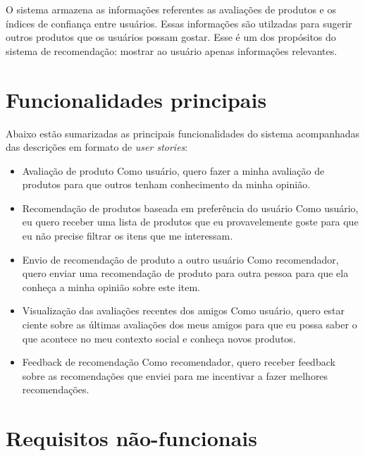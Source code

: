  O sistema armazena as informações referentes as avaliações de produtos e os índices de confiança entre usuários. Essas informações são utilzadas para sugerir outros produtos que os usuários possam gostar. Esse é um dos propósitos do sistema de recomendação: mostrar ao usuário apenas informações relevantes.

\section{Funcionalidades principais} %
\label{sec:funcionalidades_principais}

Abaixo estão sumarizadas as principais funcionalidades do sistema acompanhadas das descrições em formato de \textit{user stories}\cite{557458}:

\begin{itemize}
	
	\item Avaliação de produto
  \subitem Como usuário, quero fazer a minha avaliação de produtos para que outros tenham conhecimento da minha opinião.
  
	\item Recomendação de produtos baseada em preferência do usuário
	\subitem Como usuário, eu quero receber uma lista de produtos que eu provavelemente goste para que eu não precise filtrar os itens que me interessam.

	\item Envio de recomendação de produto a outro usuário
  \subitem Como recomendador, quero enviar uma recomendação de produto para outra pessoa para que ela conheça a minha opinião sobre este item.

    \item Visualização das avaliações recentes dos amigos
    \subitem Como usuário, quero estar ciente sobre as últimas avaliações dos meus amigos para que eu possa saber o que acontece no meu contexto social e conheça novos produtos.

    \item Feedback de recomendação
    \subitem Como recomendador, quero receber feedback sobre as recomendações que enviei para me incentivar a fazer melhores recomendações.
	
\end{itemize}

\section{Requisitos não-funcionais}

